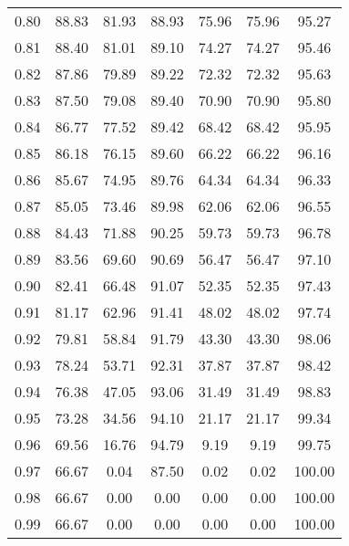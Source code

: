 \begin{tabular}{|c|c|c|c|c|c|c|}
      0.80 &     88.83 &     81.93 &      88.93 &   75.96 &      75.96 &         95.27 \\
      0.81 &     88.40 &     81.01 &      89.10 &   74.27 &      74.27 &         95.46 \\
      0.82 &     87.86 &     79.89 &      89.22 &   72.32 &      72.32 &         95.63 \\
      0.83 &     87.50 &     79.08 &      89.40 &   70.90 &      70.90 &         95.80 \\
      0.84 &     86.77 &     77.52 &      89.42 &   68.42 &      68.42 &         95.95 \\
      0.85 &     86.18 &     76.15 &      89.60 &   66.22 &      66.22 &         96.16 \\
      0.86 &     85.67 &     74.95 &      89.76 &   64.34 &      64.34 &         96.33 \\
      0.87 &     85.05 &     73.46 &      89.98 &   62.06 &      62.06 &         96.55 \\
      0.88 &     84.43 &     71.88 &      90.25 &   59.73 &      59.73 &         96.78 \\
      0.89 &     83.56 &     69.60 &      90.69 &   56.47 &      56.47 &         97.10 \\
      0.90 &     82.41 &     66.48 &      91.07 &   52.35 &      52.35 &         97.43 \\
      0.91 &     81.17 &     62.96 &      91.41 &   48.02 &      48.02 &         97.74 \\
      0.92 &     79.81 &     58.84 &      91.79 &   43.30 &      43.30 &         98.06 \\
      0.93 &     78.24 &     53.71 &      92.31 &   37.87 &      37.87 &         98.42 \\
      0.94 &     76.38 &     47.05 &      93.06 &   31.49 &      31.49 &         98.83 \\
      0.95 &     73.28 &     34.56 &      94.10 &   21.17 &      21.17 &         99.34 \\
      0.96 &     69.56 &     16.76 &      94.79 &    9.19 &       9.19 &         99.75 \\
      0.97 &     66.67 &      0.04 &      87.50 &    0.02 &       0.02 &        100.00 \\
      0.98 &     66.67 &      0.00 &       0.00 &    0.00 &       0.00 &        100.00 \\
      0.99 &     66.67 &      0.00 &       0.00 &    0.00 &       0.00 &        100.00 \\
\bottomrule
\end{tabular}
